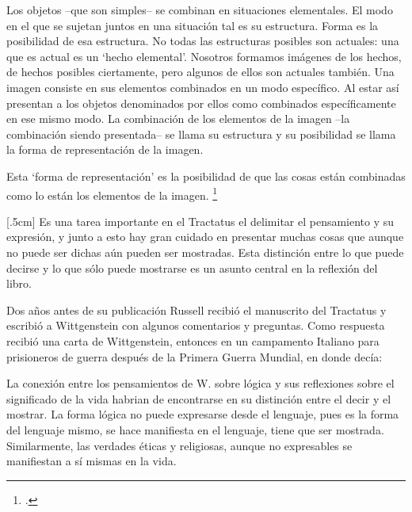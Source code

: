 Los objetos --que son simples-- se combinan en situaciones elementales. El modo
en el que se sujetan juntos en una situación tal es su estructura. Forma es la
posibilidad de esa estructura. No todas las estructuras posibles son actuales:
una que es actual es un `hecho elemental'. Nosotros formamos imágenes de los
hechos, de hechos posibles ciertamente, pero algunos de ellos son actuales
también. Una imagen consiste en sus elementos combinados en un modo específico.
Al estar así presentan a los objetos denominados por ellos como combinados
específicamente en ese mismo modo. La combinación de los elementos de la imagen
--la combinación siendo presentada-- se llama su estructura y su posibilidad se
llama la forma de representación de la imagen. 

Esta `forma de representación' es la posibilidad de que las cosas están
combinadas como lo están los elementos de la imagen. \footcite[p.
171]{simplicity}

[.5cm]
Es una tarea importante en el Tractatus el delimitar el pensamiento y su
expresión, y junto a esto hay gran cuidado en presentar muchas cosas que aunque
no puede ser dichas aún pueden ser mostradas. Esta distinción entre lo que puede
decirse y lo que sólo puede mostrarse es un asunto central en la reflexión del
libro. 

Dos años antes de su publicación Russell recibió el manuscrito del Tractatus y
escribió a Wittgenstein con algunos comentarios y preguntas. Como respuesta
recibió una carta de Wittgenstein, entonces en un campamento Italiano para
prisioneros de guerra después de la Primera Guerra Mundial, en donde decía:


La conexión entre los pensamientos de W. sobre lógica y sus reflexiones sobre el
significado de la vida habrian de encontrarse en su distinción entre el decir y
el mostrar. La forma lógica no puede expresarse desde el lenguaje, pues es la
forma del lenguaje mismo, se hace manifiesta en el lenguaje, tiene que ser
mostrada. Similarmente, las verdades éticas y religiosas, aunque no expresables
se manifiestan a sí mismas en la vida. 

